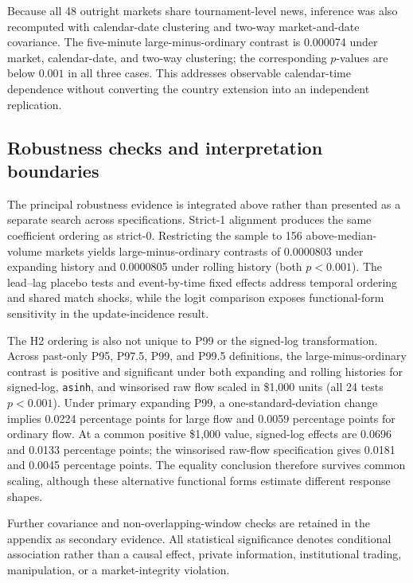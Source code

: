 Because all 48 outright markets share tournament-level news, inference was also
recomputed with calendar-date clustering and two-way market-and-date covariance.
The five-minute large-minus-ordinary contrast is 0.000074 under market,
calendar-date, and two-way clustering; the corresponding $p$-values are below
$0.001$ in all three cases. This addresses observable calendar-time dependence
without converting the country extension into an independent replication.



\subsection{Robustness checks and interpretation boundaries}
\label{sec:robustness-checks}

The principal robustness evidence is integrated above rather than presented as a
separate search across specifications. Strict-1 alignment produces the same
coefficient ordering as strict-0. Restricting the sample to 156
above-median-volume markets yields large-minus-ordinary contrasts of 0.0000803 under
expanding history and 0.0000805 under rolling history (both $p<0.001$). The
lead--lag placebo tests and event-by-time fixed effects address temporal ordering
and shared match shocks, while the logit comparison exposes functional-form
sensitivity in the update-incidence result.

The H2 ordering is also not unique to P99 or the signed-log transformation.
Across past-only P95, P97.5, P99, and P99.5 definitions, the large-minus-ordinary
contrast is positive and significant under both expanding and rolling histories
for signed-log, \texttt{asinh}, and winsorised raw flow scaled in \$1,000 units
(all 24 tests $p<0.001$). Under primary expanding P99, a one-standard-deviation
change implies 0.0224 percentage points for large flow and 0.0059 percentage
points for ordinary flow. At a common positive \$1,000 value, signed-log effects
are 0.0696 and 0.0133 percentage points; the winsorised raw-flow specification
gives 0.0181 and 0.0045 percentage points. The equality conclusion therefore
survives common scaling, although these alternative functional forms estimate
different response shapes.

Further covariance and
non-overlapping-window checks are retained in the appendix as secondary evidence.
All statistical significance denotes conditional association rather than a
causal effect, private information, institutional trading, manipulation, or a
market-integrity violation.

